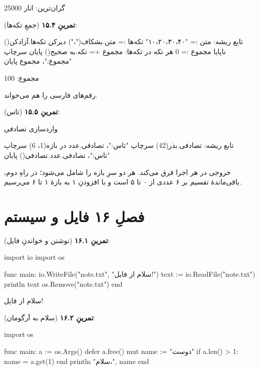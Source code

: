 \begin{progoutfa}
گران‌ترین: انار 25000
\end{progoutfa}

\textbf{تمرینِ ۱۵.۴} (جمعِ تکه‌ها):
\begin{salamfa}
تابع ریشه:
    متن := "۱۰،۲۰،۳۰،۴۰"
    تکه‌ها := متن.بشکاف("،")
    دیرکن تکه‌ها.آزادکن()
    ناپایا مجموع := 0
    هر تکه در تکه‌ها:
        مجموع += تکه.به صحیح()
    پایان
    سرچاپ "مجموع:"، مجموع
پایان
\end{salamfa}

\begin{progoutfa}
مجموع: 100
\end{progoutfa}

 رقم‌های فارسی را هم می‌خواند.

\textbf{تمرینِ ۱۵.۵} (تاس):
\begin{salamfa}
واردسازی تصادفی

تابع ریشه:
    تصادفی.بذر(42)
    سرچاپ "تاس:"، تصادفی.عدد در بازه(1، 6)
    سرچاپ "تاس:"، تصادفی.عدد تصادفی() %
پایان
\end{salamfa}

خروجی در هر اجرا فرق می‌کند.  هر دو سرِ بازه را شامل می‌شود؛ در راهِ دوم، باقی‌ماندهٔ تقسیم بر ۶ عددی از ۰ تا ۵ است و با افزودنِ ۱ به بازهٔ ۱ تا ۶ می‌رسیم.

\section*{فصلِ ۱۶ فایل و سیستم}
{}

\textbf{تمرینِ ۱۶.۱} (نوشتن و خواندنِ فایل):
\begin{salamen}
import io
import os

func main:
    io.WriteFile("note.txt", "سلام از فایل!")
    text := io.ReadFile("note.txt")
    println text
    os.Remove("note.txt")
end
\end{salamen}

\begin{progoutfa}
سلام از فایل!
\end{progoutfa}

\textbf{تمرینِ ۱۶.۲} (سلام به آرگومان):
\begin{salamen}
import os

func main:
    a := os.Args()
    defer a.free()
    mut name := "دوست"
    if a.len() > 1:
        name = a.get(1)
    end
    println "سلام،", name
end
\end{salamen}

